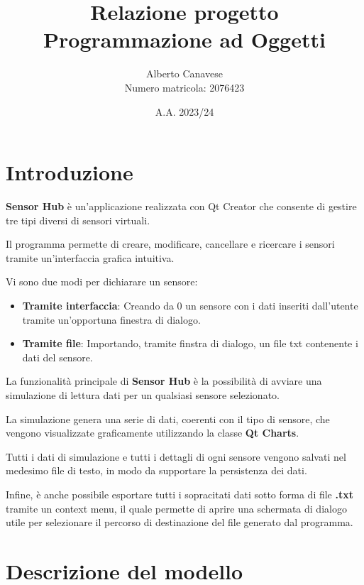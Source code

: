 \documentclass{article}
\title{Relazione progetto Programmazione ad Oggetti}
\author{Alberto Canavese\\Numero matricola: 2076423}
\date{A.A. 2023/24}
\begin{document}
    \pretitle{\begin{center}\LARGE}
    \posttitle{\end{center}}
    \preauthor{\begin{center}\large \lineskip 0.5em}
    \postauthor{\end{center}}
    \predate{\begin{center}\large}
    \postdate{\end{center}}
    \maketitle

    \newpage
    \section{Introduzione}
    \textbf{Sensor Hub} è un'applicazione realizzata con Qt Creator che consente di gestire tre tipi
    diversi di sensori virtuali.
    
    Il programma permette di creare, modificare, cancellare e ricercare i sensori tramite un'interfaccia
     grafica intuitiva.
        
    Vi sono due modi per dichiarare un sensore:
    \begin{itemize}
        \item \textbf{Tramite interfaccia}: Creando da 0 un sensore con i dati inseriti dall'utente tramite un'opportuna finestra di dialogo.
        \item \textbf{Tramite file}: Importando, tramite finstra di dialogo, un file txt contenente i dati del sensore.
    \end{itemize} 
    La funzionalità principale di \textbf{Sensor Hub} è la possibilità di avviare una simulazione di lettura dati per un qualsiasi sensore selezionato. 
    
    La simulazione genera una serie di dati, coerenti con il tipo di sensore, che vengono visualizzate graficamente utilizzando la classe \textbf{Qt Charts}.

    Tutti i dati di simulazione e tutti i dettagli di ogni sensore vengono salvati nel medesimo file di testo, in modo da supportare la persistenza dei dati. 

    Infine, è anche possibile esportare tutti i sopracitati dati sotto forma di file \textbf{.txt} tramite un context menu, il quale permette di aprire una schermata
    di dialogo utile per selezionare il percorso di destinazione del file generato dal programma.  

    \section{Descrizione del modello}
\end{document}
